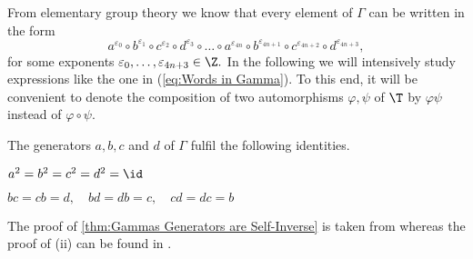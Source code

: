 From elementary group theory we know that every element of $\Gamma$ can be written in the form
\begin{equation}\label{eq:Words in Gamma}
a^{\varepsilon_0}\circ b^{\varepsilon_1}\circ c^{\varepsilon_2}\circ d^{\varepsilon_3}\circ\ldots\circ a^{\varepsilon_{4n}}\circ b^{\varepsilon_{4n+1}}\circ c^{\varepsilon_{4n+2}}\circ d^{\varepsilon_{4n+3}},
\end{equation}
for some exponents $\varepsilon_0,\ldots,\varepsilon_{4n+3}\in\Z.$ In the following we will intensively study expressions like the one in (\ref{eq:Words in Gamma}). To this end, it will be convenient to denote the composition of two automorphisms $\varphi,\psi$ of $\T$ by $\varphi\psi$ instead of $\varphi\circ\psi.$

\begin{thm}\label{thm:Relations of the generators of Gamma}
The generators $a,b,c$ and $d$ of $\Gamma$ fulfil the following identities.
\begin{thmlist}
\item $a^2=b^2=c^2=d^2=\id$\label{thm:Gammas Generators are Self-Inverse}
\item $bc=cb=d,\quad bd=db=c,\quad cd=dc=b$\label{thm:Three Generators Suffice}
\end{thmlist}
\end{thm}

The proof of \cref{thm:Gammas Generators are Self-Inverse} is taken from \cite{hudec2006burnside} whereas the proof of (ii) can be found in \cite{waddle2008grigorchuk}.

